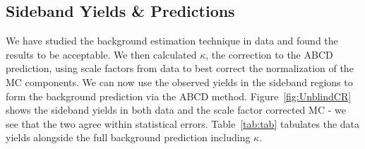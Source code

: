 \subsection{Sideband Yields \& Predictions}

We have studied the background estimation technique in data and found the results to be acceptable. We then calculated $\kappa$, the correction to the ABCD prediction, using scale factors from data to best correct the normalization of the MC components. We can now use the observed yields in the sideband regions to form the background prediction via the ABCD method. Figure~\ref{fig:UnblindCR} shows the sideband yields in both data and the scale factor corrected MC - we see that the two agree within statistical errors. Table~\ref{tab:tab} tabulates the data yields alongside the full background prediction including $\kappa$.

